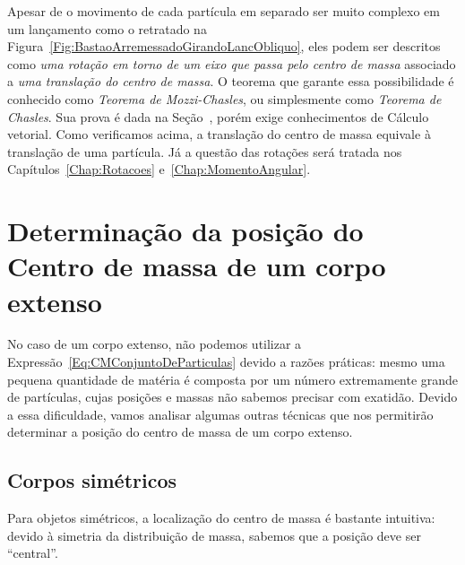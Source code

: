 Apesar de o movimento de cada partícula em separado ser muito complexo em um lançamento como o retratado na Figura~\ref{Fig:BastaoArremessadoGirandoLancObliquo}, eles podem ser descritos como \emph{uma rotação em torno de um eixo que passa pelo centro de massa} associado a \emph{uma translação do centro de massa}. O teorema que garante essa possibilidade é conhecido como \emph{Teorema de Mozzi-Chasles}, ou simplesmente como \emph{Teorema de Chasles}. Sua prova é dada na Seção~\label{Sec:DeducaoTeoremaDeMozziChasles}, porém exige conhecimentos de Cálculo vetorial. Como verificamos acima, a translação do centro de massa equivale à translação de uma partícula. Já a questão das rotações será tratada nos Capítulos~\ref{Chap:Rotacoes} e~\ref{Chap:MomentoAngular}.

\section{Determinação da posição do Centro de massa de um corpo extenso}

No caso de um corpo extenso, não podemos utilizar a Expressão~\eqref{Eq:CMConjuntoDeParticulas} devido a razões práticas: mesmo uma pequena quantidade de matéria é composta por um número extremamente grande de partículas, cujas posições e massas não sabemos precisar com exatidão. Devido a essa dificuldade, vamos analisar algumas outras técnicas que nos permitirão determinar a posição do centro de massa de um corpo extenso.

\subsection{Corpos simétricos}

\begin{marginfigure}
\centering
{}
\caption{Para objetos simétricos, a localização do centro de massa é bastante intuitiva: devido à simetria da distribuição de massa, sabemos que a posição deve ser ``central''. \label{Fig:CMFigurasSimetricas}}
\end{marginfigure}

